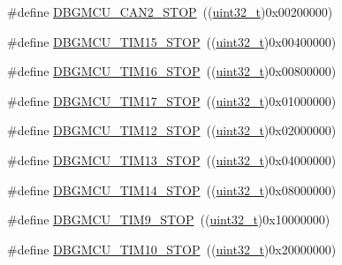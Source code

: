 \begin{DoxyCompactItemize}
\item 
\#define \hyperlink{group___d_b_g_m_c_u___exported___constants_gace53677f1b7b9a52b592cf2b0f3f7178}{D\+B\+G\+M\+C\+U\+\_\+\+C\+A\+N2\+\_\+\+S\+T\+OP}~((\hyperlink{_p_e___types_8h_a33594304e786b158f3fb30289278f5af}{uint32\+\_\+t})0x00200000)
\item 
\#define \hyperlink{group___d_b_g_m_c_u___exported___constants_ga68f2b4e7feb0a1f1e4b437a104c30f03}{D\+B\+G\+M\+C\+U\+\_\+\+T\+I\+M15\+\_\+\+S\+T\+OP}~((\hyperlink{_p_e___types_8h_a33594304e786b158f3fb30289278f5af}{uint32\+\_\+t})0x00400000)
\item 
\#define \hyperlink{group___d_b_g_m_c_u___exported___constants_ga8a0698403a9c76115bc607ee0149193f}{D\+B\+G\+M\+C\+U\+\_\+\+T\+I\+M16\+\_\+\+S\+T\+OP}~((\hyperlink{_p_e___types_8h_a33594304e786b158f3fb30289278f5af}{uint32\+\_\+t})0x00800000)
\item 
\#define \hyperlink{group___d_b_g_m_c_u___exported___constants_gabf3a93a60431c892bdf36ff02081badc}{D\+B\+G\+M\+C\+U\+\_\+\+T\+I\+M17\+\_\+\+S\+T\+OP}~((\hyperlink{_p_e___types_8h_a33594304e786b158f3fb30289278f5af}{uint32\+\_\+t})0x01000000)
\item 
\#define \hyperlink{group___d_b_g_m_c_u___exported___constants_ga4814287cef24f57e795b0f5b0174b49c}{D\+B\+G\+M\+C\+U\+\_\+\+T\+I\+M12\+\_\+\+S\+T\+OP}~((\hyperlink{_p_e___types_8h_a33594304e786b158f3fb30289278f5af}{uint32\+\_\+t})0x02000000)
\item 
\#define \hyperlink{group___d_b_g_m_c_u___exported___constants_gae0dd8a28977b261b013fa1ecda79b289}{D\+B\+G\+M\+C\+U\+\_\+\+T\+I\+M13\+\_\+\+S\+T\+OP}~((\hyperlink{_p_e___types_8h_a33594304e786b158f3fb30289278f5af}{uint32\+\_\+t})0x04000000)
\item 
\#define \hyperlink{group___d_b_g_m_c_u___exported___constants_ga731f63d66045abee68dbc634070df051}{D\+B\+G\+M\+C\+U\+\_\+\+T\+I\+M14\+\_\+\+S\+T\+OP}~((\hyperlink{_p_e___types_8h_a33594304e786b158f3fb30289278f5af}{uint32\+\_\+t})0x08000000)
\item 
\#define \hyperlink{group___d_b_g_m_c_u___exported___constants_ga560c557a0d0839dba04f7f2b47851109}{D\+B\+G\+M\+C\+U\+\_\+\+T\+I\+M9\+\_\+\+S\+T\+OP}~((\hyperlink{_p_e___types_8h_a33594304e786b158f3fb30289278f5af}{uint32\+\_\+t})0x10000000)
\item 
\#define \hyperlink{group___d_b_g_m_c_u___exported___constants_ga1f0ae2f78e1f9d7eb819bf49b13b5327}{D\+B\+G\+M\+C\+U\+\_\+\+T\+I\+M10\+\_\+\+S\+T\+OP}~((\hyperlink{_p_e___types_8h_a33594304e786b158f3fb30289278f5af}{uint32\+\_\+t})0x20000000)
\item 

\end{DoxyCompactItemize}
